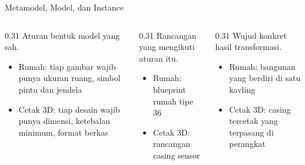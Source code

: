 \documentclass[aspectratio=169, table]{beamer}
\begin{document}
\begin{frame}{Metamodel, Model, dan Instance}
\vspace{10pt}
\centering
{}%

\vspace{8pt}

\begin{columns}[t]
\begin{column}{0.31\textwidth}
Aturan bentuk model yang sah.
\begin{itemize}
  \item Rumah: tiap gambar wajib punya ukuran ruang, simbol pintu dan jendela
  \item Cetak 3D: tiap desain wajib punya dimensi, ketebalan minimum, format berkas
\end{itemize}
\end{column}

\begin{column}{0.31\textwidth}
Rancangan yang mengikuti aturan itu.
\begin{itemize}
  \item Rumah: blueprint rumah tipe 36
  \item Cetak 3D: rancangan casing sensor
\end{itemize}
\end{column}

\begin{column}{0.31\textwidth}
Wujud konkret hasil transformasi.
\begin{itemize}
  \item Rumah: bangunan yang berdiri di satu kavling
  \item Cetak 3D: casing tercetak yang terpasang di perangkat
\end{itemize}
\end{column}
\end{columns}
\end{frame}
\end{document}
